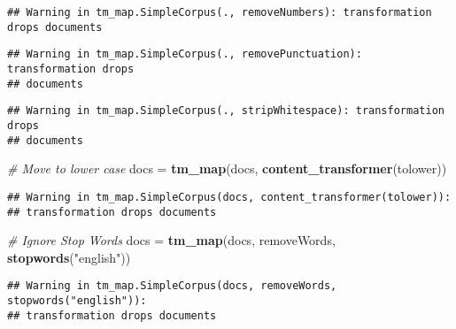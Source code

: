 \documentclass[]{article}
\newenvironment{Shaded}{\begin{snugshade}}{\end{snugshade}}
\newcommand{\CommentTok}[1]{\textcolor[rgb]{0.56,0.35,0.01}{\textit{#1}}}
\newcommand{\KeywordTok}[1]{\textcolor[rgb]{0.13,0.29,0.53}{\textbf{#1}}}
\newcommand{\NormalTok}[1]{#1}
\newcommand{\StringTok}[1]{\textcolor[rgb]{0.31,0.60,0.02}{#1}}
\begin{document}
\begin{verbatim}
## Warning in tm_map.SimpleCorpus(., removeNumbers): transformation drops documents
\end{verbatim}

\begin{verbatim}
## Warning in tm_map.SimpleCorpus(., removePunctuation): transformation drops
## documents
\end{verbatim}

\begin{verbatim}
## Warning in tm_map.SimpleCorpus(., stripWhitespace): transformation drops
## documents
\end{verbatim}

\begin{Shaded}
\begin{Highlighting}[]
\CommentTok{# Move to lower case}
\NormalTok{docs =}\StringTok{ }\KeywordTok{tm_map}\NormalTok{(docs, }\KeywordTok{content_transformer}\NormalTok{(tolower))}
\end{Highlighting}
\end{Shaded}

\begin{verbatim}
## Warning in tm_map.SimpleCorpus(docs, content_transformer(tolower)):
## transformation drops documents
\end{verbatim}

\begin{Shaded}
\begin{Highlighting}[]
\CommentTok{# Ignore Stop Words}
\NormalTok{docs =}\StringTok{ }\KeywordTok{tm_map}\NormalTok{(docs, removeWords, }\KeywordTok{stopwords}\NormalTok{(}\StringTok{"english"}\NormalTok{))}
\end{Highlighting}
\end{Shaded}

\begin{verbatim}
## Warning in tm_map.SimpleCorpus(docs, removeWords, stopwords("english")):
## transformation drops documents
\end{verbatim}
\end{document}
